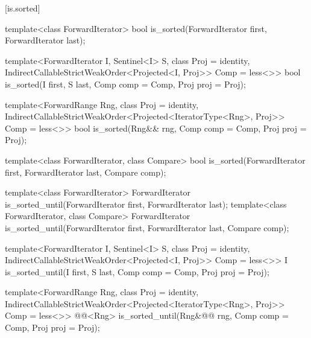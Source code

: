 [is.sorted]{}

%
\begin{removedblock}
\begin{itemdecl}
template<class ForwardIterator>
  bool is_sorted(ForwardIterator first, ForwardIterator last);
\end{itemdecl}
\end{removedblock}
\begin{addedblock}
\begin{itemdecl}
template<ForwardIterator I, Sentinel<I> S, class Proj = identity,
    IndirectCallableStrictWeakOrder<Projected<I, Proj>> Comp = less<>>
  bool is_sorted(I first, S last, Comp comp = Comp{}, Proj proj = Proj{});

template<ForwardRange Rng, class Proj = identity,
    IndirectCallableStrictWeakOrder<Projected<IteratorType<Rng>, Proj>> Comp = less<>>
  bool
    is_sorted(Rng&& rng, Comp comp = Comp{}, Proj proj = Proj{});
\end{itemdecl}
\end{addedblock}

\begin{itemdescr}
\pnum
\returns {}
\end{itemdescr}

\begin{removedblock}
%
\begin{itemdecl}
template<class ForwardIterator, class Compare>
  bool is_sorted(ForwardIterator first, ForwardIterator last,
    Compare comp);
\end{itemdecl}

\begin{itemdescr}
\pnum
\returns {}
\end{itemdescr}
\end{removedblock}

%
\begin{removedblock}
\begin{itemdecl}
template<class ForwardIterator>
  ForwardIterator is_sorted_until(ForwardIterator first, ForwardIterator last);
template<class ForwardIterator, class Compare>
  ForwardIterator is_sorted_until(ForwardIterator first, ForwardIterator last,
    Compare comp);
\end{itemdecl}
\end{removedblock}
\begin{addedblock}
\begin{itemdecl}
template<ForwardIterator I, Sentinel<I> S, class Proj = identity,
    IndirectCallableStrictWeakOrder<Projected<I, Proj>> Comp = less<>>
  I is_sorted_until(I first, S last, Comp comp = Comp{}, Proj proj = Proj{});

template<ForwardRange Rng, class Proj = identity,
    IndirectCallableStrictWeakOrder<Projected<IteratorType<Rng>, Proj>> Comp = less<>>
  @@<Rng>
    is_sorted_until(Rng&@\newtxt{\&}@ rng, Comp comp = Comp{}, Proj proj = Proj{});
\end{itemdecl}
\end{addedblock}

